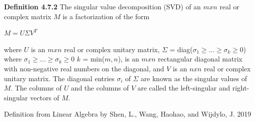 \documentclass[12pt]{article}
\begin{document}
\noindent \textbf{Definition 4.7.2}
The singular value decomposition (SVD) of an $m x n$ real or complex matrix $M$ is a factorization of the form
\begin{center}
$M = U \Sigma V^T$
\end{center}
where $U$ is an $m x n$ real or complex unitary matrix, $\Sigma$ = diag($\sigma_1\ge...\ge\sigma_k\ge0$) where 
$\sigma_1\ge...\ge\sigma_k\ge0$ $k$ = min($m, n$), is an $m x n$ rectangular diagonal matrix with non-negative real numbers on the diagonal, and $V$ is an $n x n$ real or complex unitary matrix. The diagonal entries $\sigma_i$ of $\Sigma$ are known as the singular values of $M$. The columns of $U$ and the columns of $V$ are called the left-singular and right-singular vectors of $M$.
\begin{center}
\tiny
Definition from Linear Algebra by Shen, L., Wang, Haohao, and Wijdylo, J. 2019
\end{center}
\end{document}
